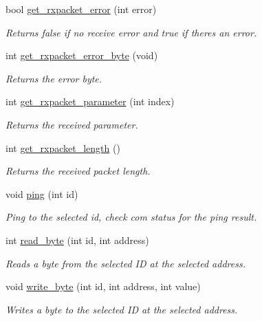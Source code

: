 \begin{DoxyCompactItemize}
bool \hyperlink{a00004_a843b0aac721e4264e7e3097f80980243}{get\+\_\+rxpacket\+\_\+error} (int error)
\begin{DoxyCompactList}\small\item\em Returns false if no receive error and true if there\textquotesingle{}s an error. \end{DoxyCompactList}\item 
int \hyperlink{a00004_a6e62341ef9f51b6e152e769bd7be9d75}{get\+\_\+rxpacket\+\_\+error\+\_\+byte} (void)
\begin{DoxyCompactList}\small\item\em Returns the error byte. \end{DoxyCompactList}\item 
int \hyperlink{a00004_a68b5fa99719a9aec0734ecfb0635503b}{get\+\_\+rxpacket\+\_\+parameter} (int index)
\begin{DoxyCompactList}\small\item\em Returns the received parameter. \end{DoxyCompactList}\item 
int \hyperlink{a00004_ae9cc18fdeda8329f68fa0f2f0a7a9aba}{get\+\_\+rxpacket\+\_\+length} ()
\begin{DoxyCompactList}\small\item\em Returns the received packet length. \end{DoxyCompactList}\item 
void \hyperlink{a00004_af2bd714423e7c4fc089762805c0c71f3}{ping} (int id)
\begin{DoxyCompactList}\small\item\em Ping to the selected id, check com status for the ping result. \end{DoxyCompactList}\item 
int \hyperlink{a00004_a888404b41c4c4395a0b745c77ff2cea9}{read\+\_\+byte} (int id, int address)
\begin{DoxyCompactList}\small\item\em Reads a byte from the selected I\+D at the selected address. \end{DoxyCompactList}\item 
void \hyperlink{a00004_a66c1e32cc45dd46d329f1fc212e46a3d}{write\+\_\+byte} (int id, int address, int value)
\begin{DoxyCompactList}\small\item\em Writes a byte to the selected I\+D at the selected address. \end{DoxyCompactList}\item 

\end{DoxyCompactItemize}
